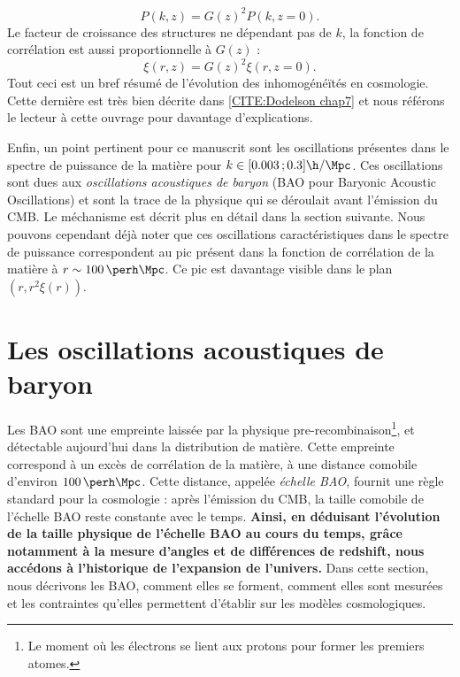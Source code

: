 \documentclass[11pt, twoside, a4paper, openright]{report}
\begin{document}
\begin{equation}
  \label{eq:pow_spec_vs_z}
  P(k,z) = G(z)^{2} P(k,z=0) .
\end{equation}
Le facteur de croissance des structures ne dépendant pas de $k$, la fonction de corrélation est aussi proportionnelle à $G(z)$ :
\begin{equation}
  \label{eq:cf_vs_z}
  \xi(r, z) = G(z)^{2} \xi(r, z=0).
\end{equation}
Tout ceci est un bref résumé de l'évolution des inhomogénéïtés en cosmologie. Cette dernière est très bien décrite dans \ref{CITE:Dodelson chap7} et nous référons le lecteur à cette ouvrage pour davantage d'explications.


Enfin, un point pertinent pour ce manuscrit sont les oscillations présentes dans le spectre de puissance de la matière pour $k \in [\num{0.003} \,; \num{0.3}] \si{\h\per\Mpc}$. Ces oscillations sont dues aux \emph{oscillations acoustiques de baryon} (BAO pour Baryonic Acoustic Oscillations) et sont la trace de la physique qui se déroulait avant l'émission du CMB. Le méchanisme est décrit plus en détail dans la section suivante. Nous pouvons cependant déjà noter que ces oscillations caractéristiques dans le spectre de puissance correspondent au pic présent dans la fonction de corrélation de la matière à $r \sim \SI{100}{\perh\Mpc}$. Ce pic est davantage visible dans le plan $(r, r^{2} \xi(r))$.

\section{Les oscillations acoustiques de baryon}
Les BAO sont une empreinte laissée par la physique pre-recombinaison\footnote{Le moment où les électrons se lient aux protons pour former les premiers atomes.}, et détectable aujourd'hui dans la distribution de matière. Cette empreinte correspond à un excès de corrélation de la matière, à une distance comobile d'environ $\SI{100}{\perh\Mpc}$. Cette distance, appelée \emph{échelle BAO}, fournit une règle standard pour la cosmologie : après l'émission du CMB, la taille comobile de l'échelle BAO reste constante avec le temps.
\textbf{Ainsi, en déduisant l'évolution de la taille physique de l'échelle BAO au cours du temps, grâce notamment à la mesure d'angles et de différences de redshift, nous accédons à l'historique de l'expansion de l'univers.}
Dans cette section, nous décrivons les BAO, comment elles se forment, comment elles sont mesurées et les contraintes qu'elles permettent d'établir sur les modèles cosmologiques.
\end{document}
